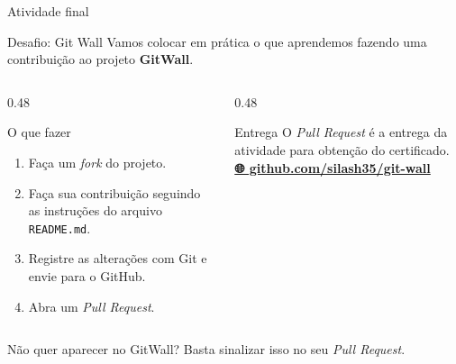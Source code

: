 \begin{frame}{Atividade final}
  \begin{block}{Desafio: Git Wall}
    Vamos colocar em prática o que aprendemos fazendo uma
    contribuição ao projeto \textbf{GitWall}.
  \end{block}
  \begin{columns}[T]
    \begin{column}{0.48\textwidth}
      \begin{block}{O que fazer}
        \begin{enumerate}
          \item Faça um \textit{fork} do projeto.
          \item Faça sua contribuição seguindo as instruções do arquivo \texttt{README.md}.
          \item Registre as alterações com Git e envie para o GitHub.
          \item Abra um \textit{Pull Request}.
        \end{enumerate}
      \end{block}
    \end{column}
    \begin{column}{0.48\textwidth}
      \begin{block}{Entrega}
        O \textit{Pull Request} é a entrega da atividade
        para obtenção do certificado.
        \vspace{0.3cm} \\
        \centering
        \href{https://github.com/silash35/git-wall}
        {\textbf{🌐 github.com/silash35/git-wall}}
      \end{block}
    \end{column}
  \end{columns}
  \vspace{0.3cm}
  \begin{block}{}
    Não quer aparecer no GitWall?
    Basta sinalizar isso no seu \textit{Pull Request}.
  \end{block}
\end{frame}

